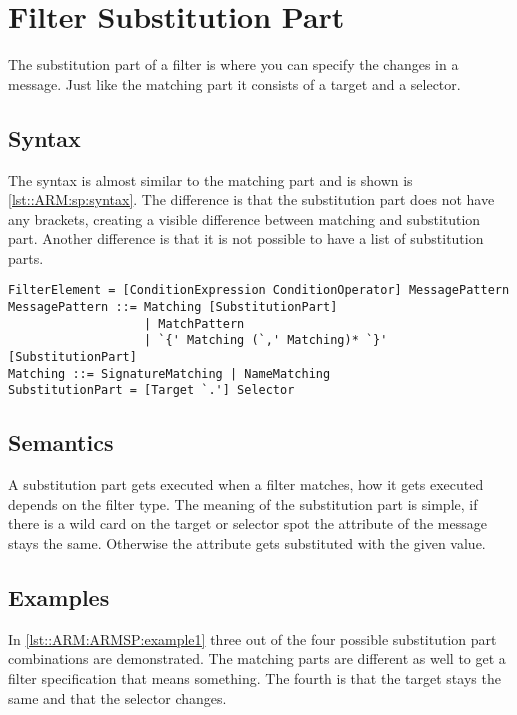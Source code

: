 \chapter{Filter Substitution Part}
The substitution part of a filter is where you can specify the changes in a message. Just like the
matching part it consists of a target and a selector.

\section*{Syntax}
The syntax is almost similar to the matching part and is shown is \autoref{lst::ARM:sp:syntax}. The difference is
that the substitution part does not have any brackets, creating a visible difference between matching and substitution part. Another difference is that it is not possible to have a list of substitution parts.

\begin{lstlisting}[caption={Filter substitution part syntax},label=lst::ARM:sp:syntax,style = listing,language = ebnf,float=tpb]
FilterElement = [ConditionExpression ConditionOperator] MessagePattern
MessagePattern ::= Matching [SubstitutionPart]
                   | MatchPattern
                   | `{' Matching (`,' Matching)* `}' [SubstitutionPart] 
Matching ::= SignatureMatching | NameMatching
SubstitutionPart = [Target `.'] Selector
\end{lstlisting}

\section*{Semantics}
A substitution part gets executed when a filter matches, how it gets executed depends on the filter type.
The meaning of the substitution part is simple, if there is a wild card on the target or selector spot the attribute of the message
stays the same. Otherwise the attribute gets substituted with the given value.

\section*{Examples}
In \autoref{lst::ARM:ARMSP:example1} three out of the four possible substitution part combinations are demonstrated. The matching parts are different as well to get a filter specification that means something.
The fourth is that the target stays the same and that the selector changes.

